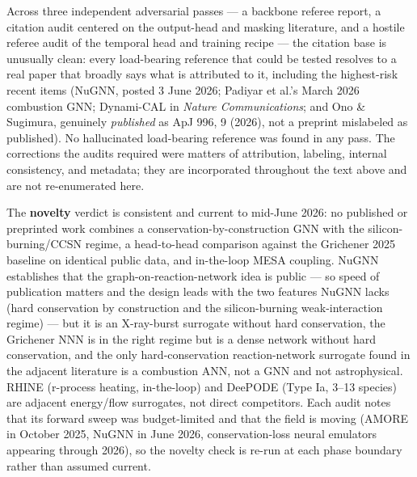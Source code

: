 \documentclass[11pt]{article}
\begin{document}
Across three independent adversarial passes --- a backbone referee report, a citation audit centered on the output-head and masking literature, and a hostile referee audit of the temporal head and training recipe --- the citation base is unusually clean: every load-bearing reference that could be tested resolves to a real paper that broadly says what is attributed to it, including the highest-risk recent items (NuGNN, posted 3 June 2026; Padiyar et al.'s March 2026 combustion GNN; Dynami-CAL in \emph{Nature Communications}; and Ono \& Sugimura, genuinely \emph{published} as ApJ 996, 9 (2026), not a preprint mislabeled as published). No hallucinated load-bearing reference was found in any pass. The corrections the audits required were matters of attribution, labeling, internal consistency, and metadata; they are incorporated throughout the text above and are not re-enumerated here.

The \textbf{novelty} verdict is consistent and current to mid-June 2026: no published or preprinted work combines a conservation-by-construction GNN with the silicon-burning/CCSN regime, a head-to-head comparison against the Grichener 2025 baseline on identical public data, and in-the-loop MESA coupling. NuGNN establishes that the graph-on-reaction-network idea is public --- so speed of publication matters and the design leads with the two features NuGNN lacks (hard conservation by construction and the silicon-burning weak-interaction regime) --- but it is an X-ray-burst surrogate without hard conservation, the Grichener NNN is in the right regime but is a dense network without hard conservation, and the only hard-conservation reaction-network surrogate found in the adjacent literature is a combustion ANN, not a GNN and not astrophysical. RHINE (r-process heating, in-the-loop) and DeePODE (Type Ia, 3--13 species) are adjacent energy/flow surrogates, not direct competitors. Each audit notes that its forward sweep was budget-limited and that the field is moving (AMORE in October 2025, NuGNN in June 2026, conservation-loss neural emulators appearing through 2026), so the novelty check is re-run at each phase boundary rather than assumed current.
\end{document}
